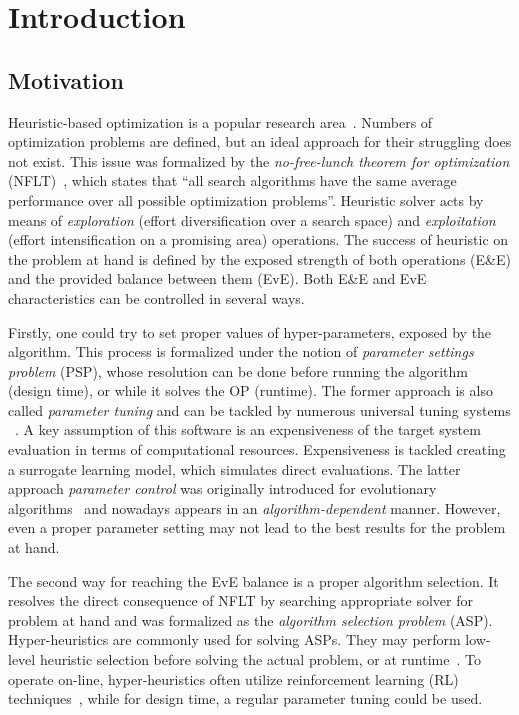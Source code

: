 \chapter{Introduction}\label{intro}

\section{Motivation}
Heuristic-based optimization is a popular research area~\cite{junger2003combinatorial,biegler2004retrospective,festa2014brief}. Numbers of optimization problems are defined, but an ideal approach for their struggling does not exist. This issue was formalized by the \emph{no-free-lunch theorem for optimization} (NFLT)~\cite{wolpert1997no}, which states that ``all search algorithms have the same average performance over all possible optimization problems''. Heuristic solver acts by means of \emph{exploration} (effort diversification over a search space) and \emph{exploitation} (effort intensification on a promising area) operations. The success of heuristic on the problem at hand is defined by the exposed strength of both operations (E\&E) and the provided balance between them (EvE). Both E\&E and EvE characteristics can be controlled in several ways.

Firstly, one could try to set proper values of hyper-parameters, exposed by the algorithm. This process is formalized under the notion of \emph{parameter settings problem} (PSP), whose resolution can be done before running the algorithm (design time), or while it solves the OP (runtime). The former approach is also called \emph{parameter tuning} and can be tackled by numerous universal tuning systems ~\cite{hutter2009paramils,hutter2011sequential,lopez2016irace,falkner2018bohb,brise2spl}. A key assumption of this software is an expensiveness of the target system evaluation in terms of computational resources. Expensiveness is tackled creating a surrogate learning model, which simulates direct evaluations. The latter approach \emph{parameter control} was originally introduced for evolutionary algorithms~\cite{karafotias2014parameter} and nowadays appears in an \emph{algorithm-dependent} manner. However, even a proper parameter setting may not lead to the best results for the problem at hand. 

The second way for reaching the EvE balance is a proper algorithm selection. It resolves the direct consequence of NFLT by searching appropriate solver for problem at hand and was formalized as the \emph{algorithm selection problem} (ASP). Hyper-heuristics are commonly used for solving ASPs. They may perform low-level heuristic selection before solving the actual problem, or at runtime~\cite{burke2019classification}. To operate on-line, hyper-heuristics often utilize reinforcement learning (RL) techniques~\cite{moriarty1999evolutionary,mcclymont2011markov}, while for design time, a regular parameter tuning could be used.

